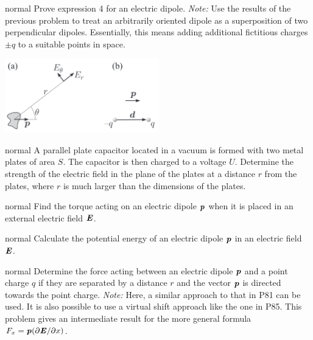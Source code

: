 \hypertarget{P82}{}
\begin{solution}{normal} %
Prove expression 4 for an electric dipole. \textit{Note:} Use the results of the previous problem to treat an arbitrarily oriented dipole as a superposition of two perpendicular dipoles. Essentially, this means adding additional fictitious charges $\pm q$ to a suitable points in space.
\begin{center}
    \includegraphics[width=0.5\textwidth]{S3 Figures/S3-82.png}
\end{center}
\end{solution}

\hypertarget{P83}{}
\begin{solution}{normal} %
A parallel plate capacitor located in a vacuum is formed with two metal plates of area $S$. The capacitor is then charged to a voltage $U$. Determine the strength of the electric field in the plane of the plates at a distance $r$ from the plates, where $r$ is much larger than the dimensions of the plates.
\end{solution}

\hypertarget{P84}{}
\begin{solution}{normal} %
Find the torque acting on an electric dipole $\textbf{\textit{p}}$ when it is placed in an external electric field $\textbf{\textit{E}}$.
\end{solution}

\hypertarget{P85}{}
\begin{solution}{normal} %
Calculate the potential energy of an electric dipole $\textbf{\textit{p}}$ in an electric field $\textbf{\textit{E}}$.
\end{solution}

\hypertarget{P86}{}
\begin{solution}{normal} %
Determine the force acting between an electric dipole $\textbf{\textit{p}}$ and a point charge $q$ if they are separated by a distance $r$ and the vector $\textbf{\textit{p}}$ is directed towards the point charge. \textit{Note:} Here, a similar approach to that in P81 can be used. It is also possible to use a virtual shift approach like the one in P85. This problem gives an intermediate result for the more general formula $F_x=\textbf{\textit{p}}(\partial\textbf{\textit{E}}/\partial x)$.
\end{solution}

